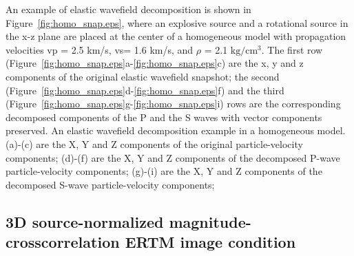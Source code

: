 \documentclass[manuscript,ulem,graphix,revised]{geophysics}
\begin{document}
An example of elastic wavefield decomposition is shown in Figure~\ref{fig:homo_snap.eps}, where an explosive source and a rotational source in the x-z plane are placed at the center of a homogeneous model with propagation velocities vp = 2.5 km/s, vs= 1.6 km/s, and $\rho$ = 2.1 $\mathrm{kg/cm^3}$. The first row (Figure~\ref{fig:homo_snap.eps}a-\ref{fig:homo_snap.eps}c) are the x, y and z components of the original elastic wavefield snapshot; the second (Figure~\ref{fig:homo_snap.eps}d-\ref{fig:homo_snap.eps}f) and the third (Figure~\ref{fig:homo_snap.eps}g-\ref{fig:homo_snap.eps}i) rows are the corresponding decomposed components of the P and the S waves with vector components preserved. 
{
An elastic wavefield decomposition example in a homogeneous model.
(a)-(c) are the X, Y and Z components of the original particle-velocity components;
(d)-(f) are the X, Y and Z components of the decomposed P-wave particle-velocity components;
(g)-(i) are the X, Y and Z components of the decomposed S-wave particle-velocity components;
}


\subsection{3D source-normalized magnitude-crosscorrelation ERTM image condition}
\end{document}
